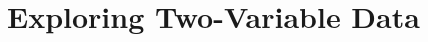 \documentclass[../stats.tex]{subfiles}
\begin{document}
\chapter{Exploring Two-Variable Data}
\end{document}
